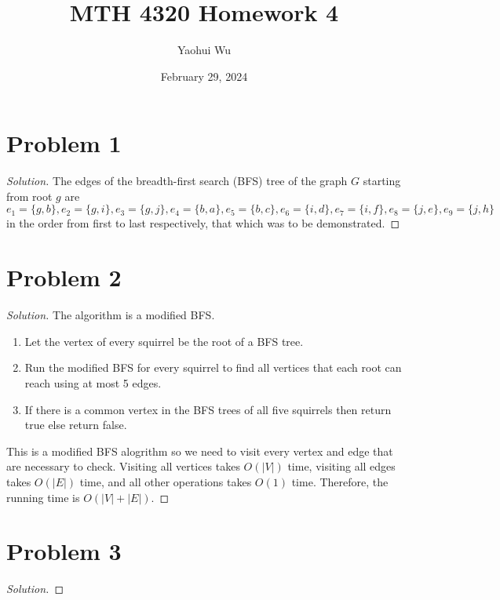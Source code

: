 \documentclass[12pt]{article}
\title{MTH 4320 Homework 4}
\author{Yaohui Wu}
\date{February 29, 2024}
\newenvironment*{solution}{\begin{proof}[Solution]}{\end{proof}}
\begin{document}
\maketitle
\section*{Problem 1}
\begin{solution}
    The edges of the breadth-first search (BFS) tree of the graph \(G\)
    starting from root \(g\) are \(e_1=\{g,b\},e_2=\{g,i\},e_3=\{g,j\},e_4=\{
        b,a\},e_5=\{b,c\},e_6=\{i,d\},e_7=\{i,f\},e_8=\{j,e\},e_9=\{j,h\}\) in
        the order from first to last respectively, that which was to be
        demonstrated.
\end{solution}
\section*{Problem 2}
\begin{solution}
    The algorithm is a modified BFS.
    \begin{enumerate}
        \item Let the vertex of every squirrel be the root of a BFS tree.
        \item Run the modified BFS  for every squirrel to find all vertices
        that each root can reach using at most 5 edges.
        \item If there is a common vertex in the BFS trees of all five
        squirrels then return true else return false.
    \end{enumerate}
    This is a modified BFS alogrithm so we need to visit every vertex and edge
    that are necessary to check. Visiting all vertices takes \(O(|V|)\) time,
    visiting all edges takes \(O(|E|)\) time, and all other operations takes
    \(O(1)\) time. Therefore, the running time is \(O(|V|+|E|)\).
\end{solution}
\section*{Problem 3}
\begin{solution}

\end{solution}
\end{document}
